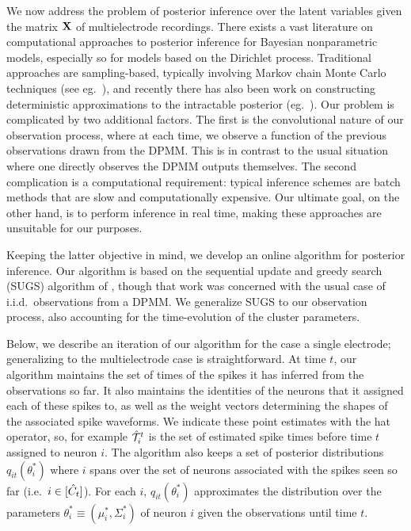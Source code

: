 \newcommand{\tx}{\tilde{x}}
\newcommand{\resx}{\delta{\bx}^L}


We now address the problem of posterior inference over the latent variables given the matrix $\mathbf{X}$ of multielectrode recordings. 
There exists a vast literature on computational approaches to posterior inference for Bayesian nonparametric models, especially so for models based on the 
Dirichlet process.
Traditional approaches are sampling-based, typically involving Markov chain Monte Carlo techniques (see eg.\ \citep{Nea2000, IshJam2001}), 
and recently there has also been work on constructing deterministic approximations to the intractable posterior (eg.\ \citep{BleJor2006, MinGha2003}).
Our problem is complicated by two additional factors. The first is the convolutional nature of our observation process, 
where at each time,
we observe a function of the previous observations drawn from the DPMM. This is in contrast to the usual situation where one directly observes 
the DPMM outputs themselves.
The second complication is a computational requirement: typical inference schemes are batch methods that are slow and computationally expensive. 
Our ultimate goal, on the other hand, is to perform inference in real time, making these approaches are unsuitable for our purposes.

Keeping the latter objective in mind, we develop an online algorithm for posterior inference. Our algorithm is based on the sequential update and
greedy search (SUGS) algorithm of
\citep{WangDun2009}, though that work was concerned with the usual case of i.i.d.\ observations from a DPMM. We generalize SUGS to our 
observation process, also accounting for the time-evolution of the cluster parameters.

Below, we describe an iteration of our algorithm for the case a single electrode; %
generalizing to the multielectrode case is straightforward. 
At time $t$, our algorithm maintains the set of times of the spikes it has inferred from the observations so far. It also maintains
the identities of the neurons that it assigned each of these spikes to, as well as the weight vectors determining the shapes of the associated spike 
waveforms. We indicate these point estimates with the hat operator, so, for example $\hat{\mathcal{T}}^t_i$ is the set of estimated spike times before time $t$ assigned
to neuron $i$. The algorithm also keeps a set of posterior distributions $q_{it}(\theta^*_i)$ where $i$ spans over the
set of neurons associated with the spikes seen so far (i.e.\ $i \in [\hat{C}_t]$). 
For each $i$, $q_{it}(\theta^*_i)$ approximates the distribution over the parameters 
$\theta_i^* \equiv (\mu_i^*, \Sigma_i^*)$ of neuron $i$ given the observations until time $t$. 

